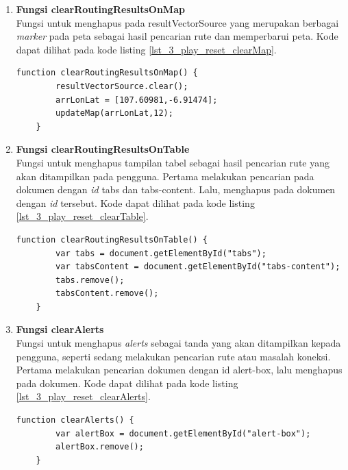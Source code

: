 \documentclass[a4paper,twoside]{article}
\begin{document}
\begin{enumerate}
\begin{enumerate}
	\item \textbf{Fungsi clearRoutingResultsOnMap}\\
	Fungsi untuk menghapus pada resultVectorSource yang merupakan berbagai \textit{marker} pada peta sebagai hasil pencarian rute dan memperbarui peta. Kode dapat dilihat pada kode listing \ref{lst_3_play_reset_clearMap}.
	\begin{lstlisting}[caption=Fungsi JavaScript untuk menghapus hasil pencarian rute pada peta ,label = {lst_3_play_reset_clearMap}]
	function clearRoutingResultsOnMap() {
		resultVectorSource.clear();
	    arrLonLat = [107.60981,-6.91474];
	    updateMap(arrLonLat,12);
	}
	\end{lstlisting}
	
	\item \textbf{Fungsi clearRoutingResultsOnTable}\\
	Fungsi untuk menghapus tampilan tabel sebagai hasil pencarian rute yang akan ditampilkan pada pengguna. Pertama melakukan pencarian pada dokumen dengan \textit{id} tabs dan tabs-content. Lalu, menghapus pada dokumen dengan \textit{id} tersebut. Kode dapat dilihat pada kode listing \ref{lst_3_play_reset_clearTable}.
	
	\begin{lstlisting}[caption=Fungsi JavaScript untuk menghapus tampilan tabel,label = {lst_3_play_reset_clearTable}]
	function clearRoutingResultsOnTable() {
		var tabs = document.getElementById("tabs");
	    var tabsContent = document.getElementById("tabs-content");
	    tabs.remove();
	    tabsContent.remove();
	}
	\end{lstlisting}
	
	\item \textbf{Fungsi clearAlerts}\\
	Fungsi untuk menghapus \textit{alerts} sebagai tanda yang akan ditampilkan kepada pengguna, seperti sedang melakukan pencarian rute atau masalah koneksi. Pertama melakukan pencarian dokumen dengan id alert-box, lalu menghapus pada dokumen. Kode dapat dilihat pada kode listing \ref{lst_3_play_reset_clearAlerts}.
	
	\begin{lstlisting}[caption=Fungsi JavaScript untuk menghilangkan \textit{alerts},label = {lst_3_play_reset_clearAlerts}]
	function clearAlerts() {
	    var alertBox = document.getElementById("alert-box");
	    alertBox.remove();
	}
	\end{lstlisting}
		

\end{enumerate}
\end{enumerate}
\end{document}
